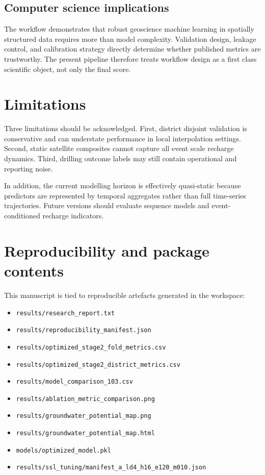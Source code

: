 \documentclass[preprint,12pt]{elsarticle}
\begin{document}
\subsection{Computer science implications}
The workflow demonstrates that robust geoscience machine learning in spatially structured data requires more than model complexity. Validation design, leakage control, and calibration strategy directly determine whether published metrics are trustworthy. The present pipeline therefore treats workflow design as a first class scientific object, not only the final score.

\section{Limitations}
Three limitations should be acknowledged. First, district disjoint validation is conservative and can understate performance in local interpolation settings. Second, static satellite composites cannot capture all event scale recharge dynamics. Third, drilling outcome labels may still contain operational and reporting noise.

In addition, the current modelling horizon is effectively quasi-static because predictors are represented by temporal aggregates rather than full time-series trajectories. Future versions should evaluate sequence models and event-conditioned recharge indicators.

\section{Reproducibility and package contents}
This manuscript is tied to reproducible artefacts generated in the workspace:
\begin{itemize}
\item \texttt{results/research\_report.txt}
\item \texttt{results/reproducibility\_manifest.json}
\item \texttt{results/optimized\_stage2\_fold\_metrics.csv}
\item \texttt{results/optimized\_stage2\_district\_metrics.csv}
\item \texttt{results/model\_comparison\_103.csv}
\item \texttt{results/ablation\_metric\_comparison.png}
\item \texttt{results/groundwater\_potential\_map.png}
\item \texttt{results/groundwater\_potential\_map.html}
\item \texttt{models/optimized\_model.pkl}
\item \texttt{results/ssl\_tuning/manifest\_a\_ld4\_h16\_e120\_m010.json}
\end{itemize}
\end{document}
